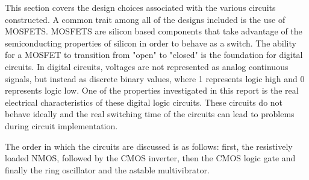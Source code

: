 



This section covers the design choices associated with the various circuits constructed. A common trait among all of the designs included is the use of  MOSFETS. MOSFETS are silicon based components that take advantage of the semiconducting properties of silicon in order to behave as a switch. The ability for a MOSFET to transition from "open" to "closed" is the foundation for digital circuits. In digital circuits, voltages are not represented as analog continuous signals, but instead as discrete binary values, where 1 represents logic high and 0 represents logic low. One of the properties investigated in this report is the real electrical characteristics of these digital logic circuits. These circuits do not behave ideally and the real switching time of the circuits can lead to problems during circuit implementation.

The order in which the circuits are discussed is as follows: first, the resistively loaded NMOS, followed by the CMOS inverter, then the CMOS logic gate and finally the ring oscillator and the astable multivibrator. 







	






